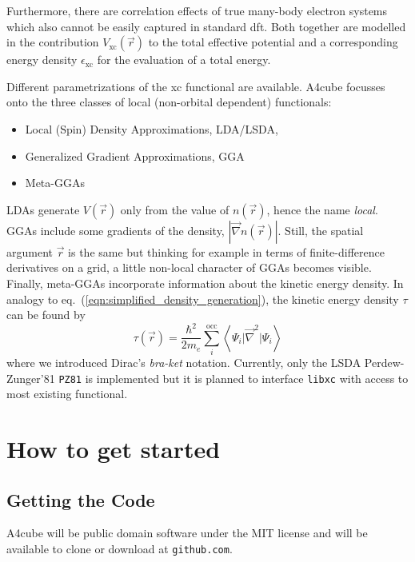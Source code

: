 \documentclass[oribibl]{llncs}
\newcommand{\um}[1]{_{\mathrm{#1}}}
\newcommand{\ttt}[1]{\texttt{#1}}
\newcommand{\braketop}[3]{\left\langle \left. #1 \right| #2 \left| #3 \right. \right\rangle}
\newcommand{\codename}{A4cube}
\begin{document}
Furthermore, there are correlation effects of true many-body electron systems
which also cannot be easily captured in standard \ac{dft}.
Both together are modelled in the contribution $V\um{xc}(\vec r)$ 
to the total effective potential and a corresponding energy density $\epsilon\um{xc}$ for the evaluation of a total energy.

Different parametrizations of the \ac{xc} functional are available.
\codename{} focusses onto the three classes of local (non-orbital dependent) functionals: 
\begin{itemize}
	\item Local (Spin) Density Approximations, LDA/LSDA, 
	\item Generalized Gradient Approximations, GGA
	\item Meta-GGAs
\end{itemize}
LDAs generate $V(\vec r)$ only from the value of $n(\vec r)$, 
hence the name \emph{local}. 
GGAs include some gradients of the density, $|\vec \nabla n(\vec r)|$.
Still, the spatial argument $\vec r$ is the same but thinking for example
in terms of finite-difference derivatives on a grid, 
a little non-local character of GGAs becomes visible.
Finally, meta-GGAs incorporate information about the kinetic energy density.
In analogy to eq.~(\ref{eqn:simplified_density_generation}), the kinetic energy density $\tau$ can be found by
\begin{equation}
	\tau(\vec r) = \frac{\hbar^2}{2m_e} \sum_i^{\mathrm{occ}} \braketop{ \Psi_i } {\vec \nabla^2 } { \Psi_i } 
	\label{eqn:simplified_kinetic_energy_density_generation}
\end{equation}
where we introduced Dirac's \emph{bra-ket} notation.
Currently, only the LSDA Perdew-Zunger'81 \ttt{PZ81} is implemented 
but it is planned to interface \ttt{libxc} with access to most existing functional.



\section{How to get started}

\subsection{Getting the Code}
\codename{} will be public domain software under the MIT license
and will be available to clone or download at \ttt{github.com}. 
\end{document}
